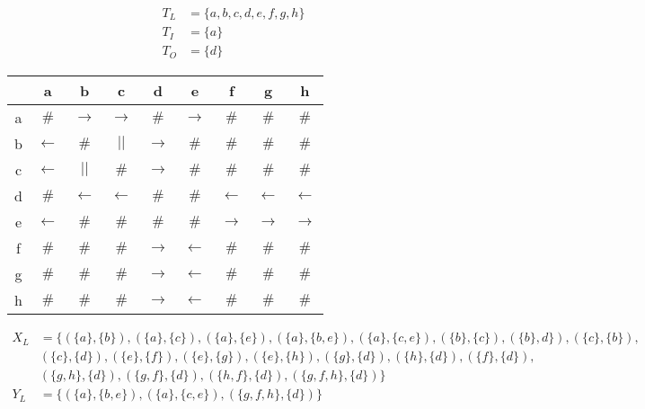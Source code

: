 \begin{align*}
T_L &= \{ a,b,c,d,e,f,g,h\}\\
T_I &= \{a\}\\
T_O &= \{d\}
\end{align*}
\begin{tabular}{c | c c c c c c c c}
	&a 	  		  &b 			 &c 			&d 	  			&e 			   &f			&g			&h\\
	\hline
a	&$\#$ 		  &$\rightarrow$ &$\rightarrow$	&$\#$ 			&$\rightarrow$ &$\#$		&$\#$
   	&$\#$\\
b	&$\leftarrow$ &$\#$			 &$||$ 			&$\rightarrow$	&$\#$ 		   &$\#$		&$\#$	
	&$\#$\\
c	&$\leftarrow$ &$||$			 &$\#$			&$\rightarrow$  &$\#$ 		   &$\#$		&$\#$	
	&$\#$\\
d	&$\#$ 		  &$\leftarrow$  &$\leftarrow$	&$\#$			&$\#$ 		   &$\leftarrow$
	&$\leftarrow$ &$\leftarrow$\\
e	&$\leftarrow$ &$\#$ 		 &$\#$			&$\#$  			&$\#$		   &$\rightarrow$
	&$\rightarrow$	&$\rightarrow$\\
f	&$\#$ 		  &$\#$			 &$\#$			&$\rightarrow$	&$\leftarrow$  &$\#$		&$\#$     
&$\#$\\
g	&$\#$ 		  &$\#$			 &$\#$			&$\rightarrow$	&$\leftarrow$  &$\#$		&$\#$     
&$\#$\\
h	&$\#$ 		  &$\#$			 &$\#$			&$\rightarrow$	&$\leftarrow$  &$\#$		&$\#$     
&$\#$\\
\end{tabular}

\begin{align*}
X_L &= \{ (\{a\},\{b\}),(\{a\},\{c\})
,(\{a\},\{e\}),(\{a\},\{b,e\}),(\{a\},\{c,e\}),(\{b\},\{c\}),(\{b\},d\}),(\{c\},\{b\}),\\
&(\{c\},\{d\}),(\{e\},\{f\}),(\{e\},\{g\}),(\{e\},\{h\}),(\{g\},\{d\}),(\{h\},\{d\}),(\{f\},\{d\}),\\
&(\{g,h\},\{d\}),(\{g,f\},\{d\}),(\{h,f\},\{d\}),(\{g,f,h\},\{d\})\}\\
Y_L &= \{(\{a\},\{b,e\}),(\{a\},\{c,e\}),(\{g,f,h\},\{d\})\}\\
\end{align*}


